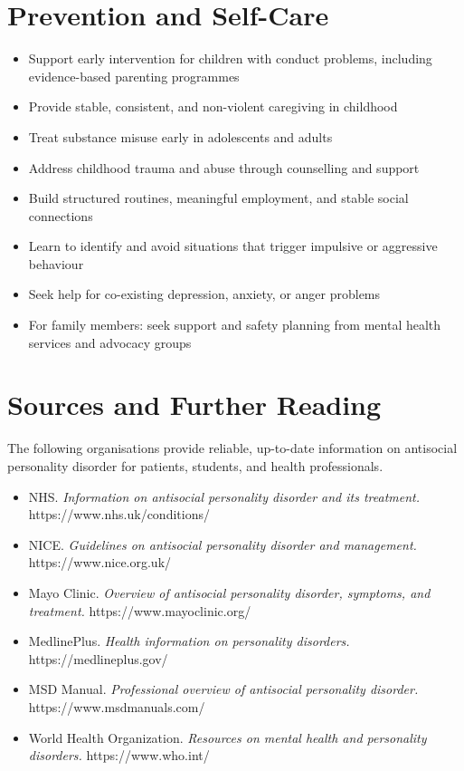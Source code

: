 \section*{Prevention and Self-Care}
\begin{itemize}
    \item Support early intervention for children with conduct problems, including evidence-based parenting programmes
    \item Provide stable, consistent, and non-violent caregiving in childhood
    \item Treat substance misuse early in adolescents and adults
    \item Address childhood trauma and abuse through counselling and support
    \item Build structured routines, meaningful employment, and stable social connections
    \item Learn to identify and avoid situations that trigger impulsive or aggressive behaviour
    \item Seek help for co-existing depression, anxiety, or anger problems
    \item For family members: seek support and safety planning from mental health services and advocacy groups
\end{itemize}

\section*{Sources and Further Reading}
The following organisations provide reliable, up-to-date information on antisocial personality disorder for patients, students, and health professionals.

\begin{itemize}
    \item NHS. \textit{Information on antisocial personality disorder and its treatment.} https://www.nhs.uk/conditions/
    \item NICE. \textit{Guidelines on antisocial personality disorder and management.} https://www.nice.org.uk/
    \item Mayo Clinic. \textit{Overview of antisocial personality disorder, symptoms, and treatment.} https://www.mayoclinic.org/
    \item MedlinePlus. \textit{Health information on personality disorders.} https://medlineplus.gov/
    \item MSD Manual. \textit{Professional overview of antisocial personality disorder.} https://www.msdmanuals.com/
    \item World Health Organization. \textit{Resources on mental health and personality disorders.} https://www.who.int/
\end{itemize}
